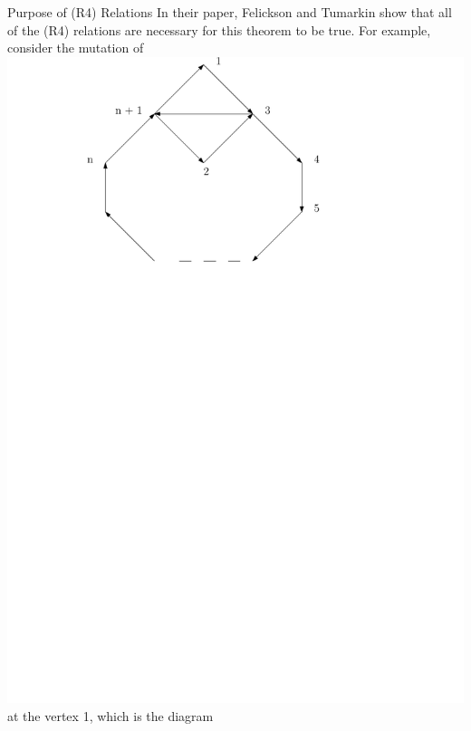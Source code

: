 \documentclass{beamer}
\begin{document}
\begin{frame}{Purpose of (R4) Relations}
In their paper, Felickson and Tumarkin show that all of the (R4) relations are necessary for this theorem to be true. For example, consider the mutation of \includegraphics[scale = .30]{Diagram2.pdf} at the vertex 1, which is the diagram
\begin{figure}

\end{figure}
\end{frame}
\end{document}
